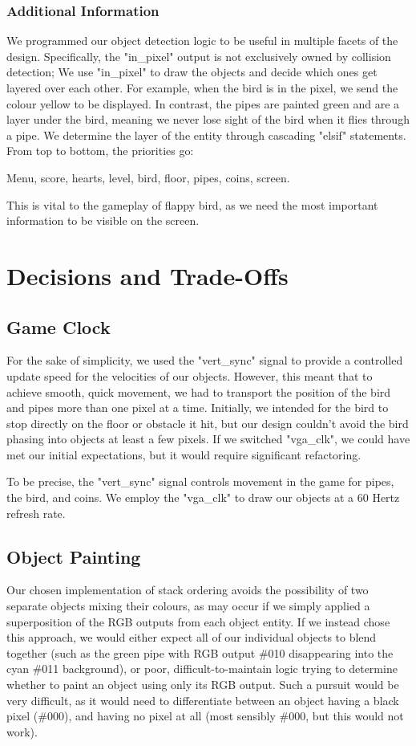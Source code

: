 \documentclass[conference]{IEEEtran}
\begin{document}
\subsubsection{Additional Information}
We programmed our object detection logic to be useful in multiple facets of the design. Specifically, the "in\_pixel" output is not exclusively owned by collision detection; We use "in\_pixel" to draw the objects and decide which ones get layered over each other. For example, when the bird is in the pixel, we send the colour yellow to be displayed. In contrast, the pipes are painted green and are a layer under the bird, meaning we never lose sight of the bird when it flies through a pipe. We determine the layer of the entity through cascading "elsif" statements. From top to bottom, the priorities go:

Menu, score, hearts, level, bird, floor, pipes, coins, screen.

This is vital to the gameplay of flappy bird, as we need the most important information to be visible on the screen.

\section{Decisions and Trade-Offs}
\subsection{Game Clock}
For the sake of simplicity, we used the "vert\_sync" signal to provide a controlled update speed for the velocities of our objects. However, this meant that to achieve smooth, quick movement, we had to transport the position of the bird and pipes more than one pixel at a time. Initially, we intended for the bird to stop directly on the floor or obstacle it hit, but our design couldn't avoid the bird phasing into objects at least a few pixels. If we switched "vga\_clk", we could have met our initial expectations, but it would require significant refactoring.

To be precise, the "vert\_sync" signal controls movement in the game for pipes, the bird, and coins. We employ the "vga\_clk" to draw our objects at a 60 Hertz refresh rate.

\subsection{Object Painting}
Our chosen implementation of stack ordering avoids the possibility of two separate objects mixing their colours, as may occur if we simply applied a superposition of the RGB outputs from each object entity. If we instead chose this approach, we would either expect all of our individual objects to blend together (such as the green pipe with RGB output \#010 disappearing into the cyan \#011 background), or poor, difficult-to-maintain logic trying to determine whether to paint an object using only its RGB output. Such a pursuit would be very difficult, as it would need to differentiate between an object having a black pixel (\#000), and having no pixel at all (most sensibly \#000, but this would not work).
\end{document}
